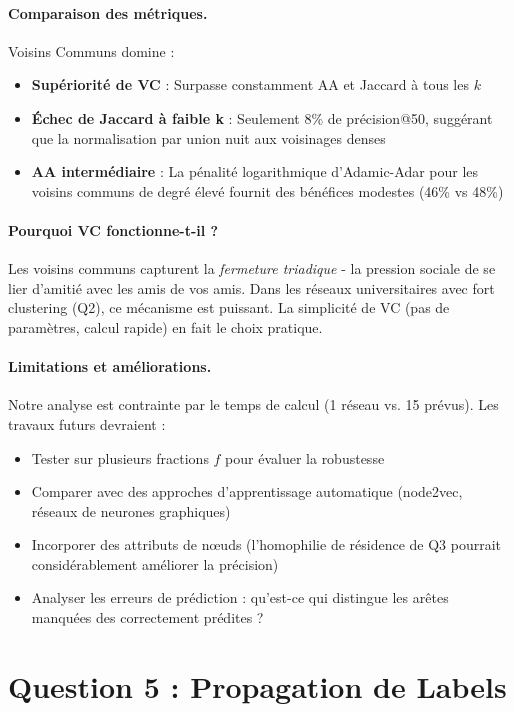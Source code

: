 \documentclass[12pt,a4paper]{article}
\begin{document}
\paragraph{Comparaison des métriques.} Voisins Communs domine :
\begin{itemize}
    \item \textbf{Supériorité de VC} : Surpasse constamment AA et Jaccard à tous les $k$
    \item \textbf{Échec de Jaccard à faible k} : Seulement 8\% de précision@50, suggérant que la normalisation par union nuit aux voisinages denses
    \item \textbf{AA intermédiaire} : La pénalité logarithmique d'Adamic-Adar pour les voisins communs de degré élevé fournit des bénéfices modestes (46\% vs 48\%)
\end{itemize}

\paragraph{Pourquoi VC fonctionne-t-il ?} Les voisins communs capturent la \textit{fermeture triadique} - la pression sociale de se lier d'amitié avec les amis de vos amis. Dans les réseaux universitaires avec fort clustering (Q2), ce mécanisme est puissant. La simplicité de VC (pas de paramètres, calcul rapide) en fait le choix pratique.

\paragraph{Limitations et améliorations.} Notre analyse est contrainte par le temps de calcul (1 réseau vs. 15 prévus). Les travaux futurs devraient :
\begin{itemize}
    \item Tester sur plusieurs fractions $f$ pour évaluer la robustesse
    \item Comparer avec des approches d'apprentissage automatique (node2vec, réseaux de neurones graphiques)
    \item Incorporer des attributs de nœuds (l'homophilie de résidence de Q3 pourrait considérablement améliorer la précision)
    \item Analyser les erreurs de prédiction : qu'est-ce qui distingue les arêtes manquées des correctement prédites ?
\end{itemize}

\section{Question 5 : Propagation de Labels}
\end{document}
